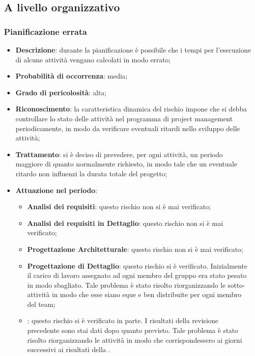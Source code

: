 	\subsection{A livello organizzativo}
		
		\subsubsection{Pianificazione errata}
		\begin{itemize}
			\item \textbf{Descrizione}: durante la pianificazione è possibile che i tempi per l'esecuzione di alcune attività vengano calcolati in modo errato;
			\item \textbf{Probabilità di occorrenza}: media;
			\item \textbf{Grado di pericolosità}: alta;
			\item \textbf{Riconoscimento}: la caratteristica dinamica del rischio impone che si debba controllare lo stato delle attività nel programma di project management periodicamente, in modo da verificare eventuali ritardi nello sviluppo delle attività;	
			\item \textbf{Trattamento}: si è deciso di prevedere, per ogni attività, un periodo maggiore di quanto normalmente richiesto, in modo tale che un eventuale ritardo non influenzi la durata totale del progetto;
			\item \textbf{Attuazione nel periodo}:
			\begin{itemize}
				\item \textbf{Analisi dei requisiti}: questo rischio non si è mai verificato;
				\item \textbf{Analisi dei requisiti in Dettaglio}: questo rischio non si è mai verificato;
				\item \textbf{Progettazione Architetturale}: questo rischio non si è mai verificato;
				\item \textbf{Progettazione di Dettaglio}: questo rischio si è verificato. Inizialmente il carico di lavoro assegnato ad ogni membro del gruppo era stato pesato in modo sbagliato. Tale problema è stato risolto riorganizzando le sotto-attività in modo che esse siano eque e ben distribuite per ogni membro del team;
				\item \textbf{\CO}: questo rischio si è verificato in parte. I risultati della revisione precedente sono stai dati dopo quanto previsto. Tale problema è stato risolto riorganizzando le attività in modo che corrispondessero ai giorni successivi ai risultati della \textit{\RR}. 
			\end{itemize}
		\end{itemize}
	
